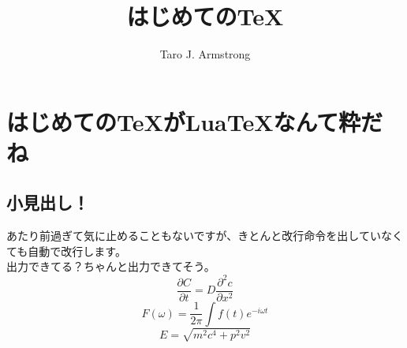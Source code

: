 \documentclass{ltjsarticle}
\begin{document}
\title{はじめての\TeX }
\author{Taro J. Armstrong}
\maketitle
\section{はじめての\TeX がLua\TeX なんて粋だね}

\subsection{小見出し！}
あたり前過ぎて気に止めることもないですが、きとんと改行命令を出していなくても自動で改行します。
\\出力できてる？ちゃんと出力できてそう。
\begin{equation}
  \frac{\partial C}{\partial t}=D\frac{\partial^2 c}{\partial x^2}
\end{equation}
\begin{equation}
  F(\omega)=\frac{1}{2\pi}\int f(t) e^{-i\omega t}
\end{equation}
\begin{equation}
  E=\sqrt{m^2c^4+p^2v^2}
\end{equation}
\end{document}
